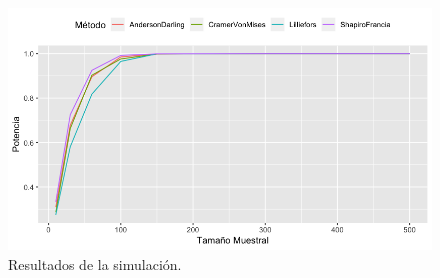 \documentclass[a4paper, spanish]{article}
\begin{document}
    \begin{figure}[htb!]
      \includegraphics[width=\linewidth]{normality-testing}
      \caption{Resultados de la simulación.}
      \label{fig:results}
    \end{figure}
\end{document}
